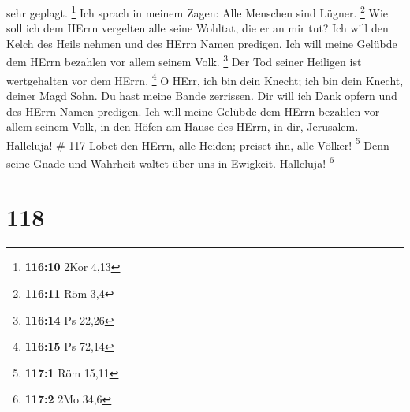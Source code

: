 sehr geplagt. \footnote{\textbf{116:10} 2Kor 4,13}  Ich
sprach in meinem Zagen: Alle Menschen sind Lügner. \footnote{\textbf{116:11}
  Röm 3,4}  Wie soll ich dem HErrn vergelten alle seine
Wohltat, die er an mir tut?  Ich will den Kelch des Heils
nehmen und des HErrn Namen predigen.  Ich will meine
Gelübde dem HErrn bezahlen vor allem seinem Volk. \footnote{\textbf{116:14}
  Ps 22,26}  Der Tod seiner Heiligen ist wertgehalten vor
dem HErrn. \footnote{\textbf{116:15} Ps 72,14}  O HErr, ich
bin dein Knecht; ich bin dein Knecht, deiner Magd Sohn. Du hast meine
Bande zerrissen.  Dir will ich Dank opfern und des HErrn
Namen predigen.  Ich will meine Gelübde dem HErrn bezahlen
vor allem seinem Volk,  in den Höfen am Hause des HErrn, in
dir, Jerusalem. Halleluja! \# 117  Lobet den HErrn, alle
Heiden; preiset ihn, alle Völker! \footnote{\textbf{117:1} Röm 15,11}
 Denn seine Gnade und Wahrheit waltet über uns in Ewigkeit.
Halleluja! \footnote{\textbf{117:2} 2Mo 34,6}

\hypertarget{section-38}{%
\section{118}\label{section-38}}

